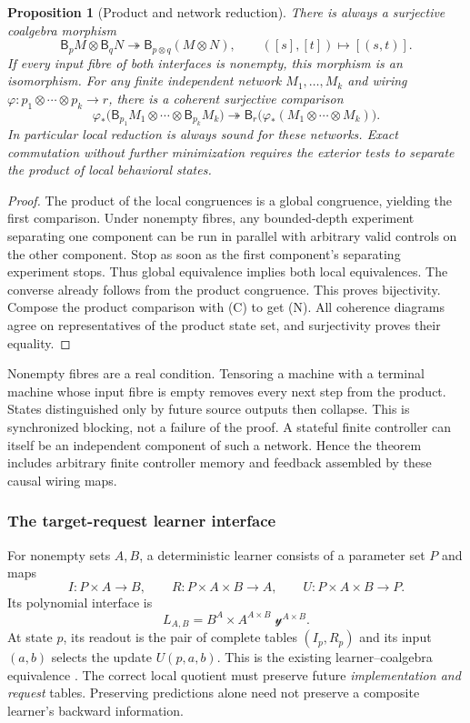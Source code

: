 \documentclass[11pt]{article}
\newtheorem{proposition}[theorem]{Proposition}
\theoremstyle{definition}
\theoremstyle{remark}\newtheorem{remark}[theorem]{Remark}
\newcommand{\Beh}{\mathsf B}
\begin{document}
\begin{proposition}[Product and network reduction]\label{p:prop:product}
There is always a surjective coalgebra morphism
\[
 \Beh_pM\otimes\Beh_qN\twoheadrightarrow\Beh_{p\otimes q}(M\otimes N),
 \qquad([s],[t])\longmapsto[(s,t)].
\]
If every input fibre of both interfaces is nonempty, this morphism is an
isomorphism. For any finite independent network $M_1,\ldots,M_k$ and
wiring $\varphi:p_1\otimes\cdots\otimes p_k\to r$, there is a coherent
surjective comparison
\[
 \varphi_*\bigl(\Beh_{p_1}M_1\otimes\cdots\otimes\Beh_{p_k}M_k\bigr)
       \twoheadrightarrow
 \Beh_r\bigl(\varphi_*(M_1\otimes\cdots\otimes M_k)\bigr). \tag{N}
\]
In particular local reduction is always sound for these networks. Exact
commutation without further minimization requires the exterior tests to
separate the product of local behavioral states.
\end{proposition}
\begin{proof}
The product of the local congruences is a global congruence, yielding the
first comparison. Under nonempty fibres, any bounded-depth experiment separating
one component can be run in parallel with arbitrary valid controls on
the other component. Stop as soon as the first component's separating
experiment stops. Thus global equivalence implies both local
equivalences. The converse already follows from the product congruence.
This proves bijectivity. Compose the product comparison with (C) to get
(N). All coherence diagrams agree on representatives of the product
state set, and surjectivity proves their equality.
\end{proof}
Nonempty fibres are a real condition. Tensoring a machine with a terminal
machine whose input fibre is empty removes every next step from the
product. States distinguished only by future source outputs then collapse.
This is synchronized blocking, not a failure of the proof.
A stateful finite controller can itself be an independent component of
such a network. Hence the theorem includes arbitrary finite controller
memory and feedback assembled by these causal wiring maps.

\subsubsection{The target-request learner interface}
For nonempty sets $A,B$, a deterministic learner consists of a
parameter set $P$ and maps
\[
 I:P\times A\to B,\qquad
 R:P\times A\times B\to A,\qquad
 U:P\times A\times B\to P.
\]
Its polynomial interface is
\[
 L_{A,B}=B^A\times A^{A\times B}\;\mathcal y^{A\times B}.
\]
At state $p$, its readout is the pair of complete tables $(I_p,R_p)$ and
its input $(a,b)$ selects the update $U(p,a,b)$. This is the existing learner--coalgebra equivalence
\cite{spivak}. The correct local quotient must preserve future
\emph{implementation and request} tables. Preserving predictions alone
need not preserve a composite learner's backward information.
\end{document}
